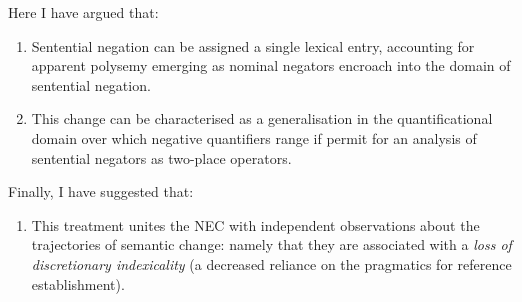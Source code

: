 Here I have argued that: 
\begin{enumerate}[\bf 1 ]
	\item Sentential negation can be assigned a single lexical entry, accounting for apparent poly\-semy emerging as nominal negators encroach into the domain of sentential negation. \item This change can be characterised as a generalisation in the quantificational domain over which negative quantifiers range if permit for an analysis of sentential negators as two-place operators. 
\end{enumerate}
Finally, I have suggested that:\par\nobreak
\begin{enumerate}[\bf 3 ]
	\item This treatment unites the \acrshort{NEC} with independent observations about the trajectories of semantic change: namely that they are associated with a \textit{loss of discretionary indexicality} (a decreased reliance on the pragmatics for reference establishment).
\end{enumerate}

